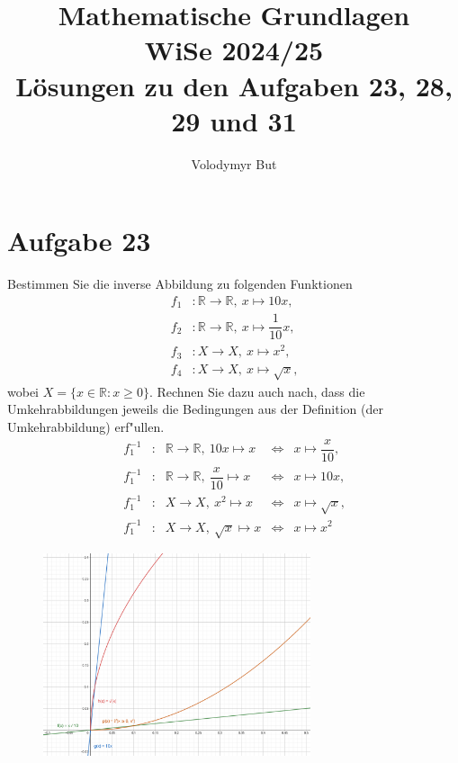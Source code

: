 \documentclass[10pt, oneside]{article}
\title{Mathematische Grundlagen\\[5pt]\Large WiSe 2024/25\\[10pt]\Large L{\"o}sungen zu den Aufgaben 23, 28, 29 und 31}
\author{Volodymyr But}
\date{}
\begin{document}
\sloppy

\maketitle
\vspace{25px}

\section{Aufgabe 23}

Bestimmen Sie die inverse Abbildung zu folgenden Funktionen
\begin{equation*}
    \begin{aligned}
        f_1 &: \mathbb{R} \rightarrow \mathbb{R},\ x \mapsto 10x \text{,} \\[5pt]
        f_2 &: \mathbb{R} \rightarrow \mathbb{R},\ x \mapsto \dfrac{1}{10}x \text{,} \\[5pt]
        f_3 &: X \rightarrow X,\ x \mapsto x^2 \text{,} \\[5pt]
        f_4 &: X \rightarrow X,\ x \mapsto \sqrt{x} \text{,}
    \end{aligned}
\end{equation*}
wobei $X = \{x \in \mathbb{R} : x \geq 0 \}$. Rechnen Sie dazu auch nach, dass
die Umkehrabbildungen jeweils die Bedingungen aus der Definition (der
Umkehrabbildung) erf"ullen.
\begin{equation*}
    \begin{array}{rcccl}
        f_1^{-1} &:& \mathbb{R} \rightarrow \mathbb{R},\ 10x \mapsto x &\iff& x \mapsto \dfrac{x}{10} \text{,} \\[10pt]
        f_1^{-1} &:& \mathbb{R} \rightarrow \mathbb{R},\ \dfrac{x}{10} \mapsto x &\iff& x \mapsto 10x \text{,} \\[10pt]
        f_1^{-1} &:& X \rightarrow X,\ x^2 \mapsto x &\iff& x \mapsto \sqrt{x} \text{,} \\[10pt]
        f_1^{-1} &:& X \rightarrow X,\ \sqrt{x} \mapsto x &\iff& x \mapsto x^2
    \end{array}
\end{equation*}
\begin{figure}[h]
    \centering
    \includegraphics[width=0.7\textwidth]{./assets/23-01.png}
\end{figure}
\end{document}
